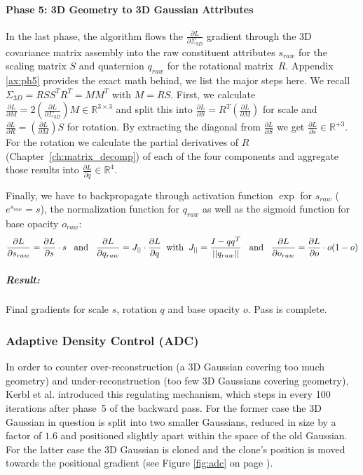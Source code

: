 \paragraph{Phase 5: 3D Geometry to 3D Gaussian Attributes} In the last phase, the algorithm flows the $\frac{\partial L}{\partial \Sigma_{3D}}$ gradient through the 3D covariance matrix assembly into the raw constituent attributes $s_{raw}$ for the scaling matrix $S$ and quaternion $q_{raw}$ for the rotational matrix~$R$.
Appendix \ref{ax:ph5} provides the exact math behind, we list the major steps here. We recall $\Sigma_{3D} = R S S^T R^T = M M^T$ with $M = RS$. First, we calculate $\frac{\partial L}{\partial M} = 2 ( \frac{\partial L}{\partial \Sigma_{3D}} ) M \in \mathbb{R}^{3\times 3}$ and split this into $\frac{\partial L}{\partial S} = R^T ( \frac{\partial L}{\partial M} )$ for scale and $\frac{\partial L}{\partial R} = ( \frac{\partial L}{\partial M} )S$ for rotation.
By extracting the diagonal from $\frac{\partial L}{\partial S}$ we get $\frac{\partial L}{\partial s} \in \mathbb{R}^{+3}$. For the rotation we calculate the partial derivatives of $R$ (Chapter~\ref{ch:matrix_decomp}) of each of the four components and aggregate those results into $\frac{\partial L}{\partial q} \in \mathbb{R}^4$.

Finally, we have to backpropagate through activation function $\exp$ for $s_{raw}$ ($e^{s_{raw}}=s$), the normalization function for $q_{raw}$ as well as the sigmoid function for base opacity $o_{raw}$:
$$
\frac{\partial L}{\partial s_{raw}} = \frac{\partial L}{\partial s} \cdot s
\hspace{3mm} \text{and} \hspace{3mm}
\frac{\partial L}{\partial q_{raw}} = J_{\vert{}\vert{}} \cdot \frac{\partial L}{\partial q}
\hspace{2mm} \text{with} \hspace{2mm}
J_{\vert{}\vert{}} = \frac{I - q q^T}{\vert{}\vert{}q_{raw}\vert{}\vert{}}
\hspace{3mm} \text{and} \hspace{3mm}
\frac{\partial L}{\partial o_{raw}} = \frac{\partial L}{\partial o} \cdot o(1 - o)
$$
\subparagraph{Result:} Final gradients for scale $s$, rotation $q$ and base opacity $o$. Pass is complete.

\subsubsection{Adaptive Density Control (ADC)}
In order to counter over-reconstruction (a 3D Gaussian covering too much geometry) and under-reconstruction (too few 3D Gaussians covering geometry), Kerbl et al. \cite{kerbl3DGaussianSplatting2023} introduced this regulating mechanism, which steps in every 100 iterations after phase~5 of the backward pass. For the former case the 3D Gaussian in question is split into two smaller Gaussians, reduced in size by a factor of $1.6$ and positioned slightly apart within the space of the old Gaussian. For the latter case the 3D Gaussian is cloned and the clone's position is moved towards the positional gradient (see Figure \ref{fig:adc} on page \pageref{fig:adc}). 

